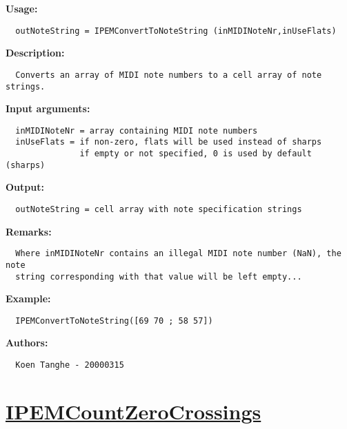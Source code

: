 \textbf{Usage:}
\begin{verbatim}  outNoteString = IPEMConvertToNoteString (inMIDINoteNr,inUseFlats)

\end{verbatim}
\textbf{Description:}
\begin{verbatim}  Converts an array of MIDI note numbers to a cell array of note strings.

\end{verbatim}
\textbf{Input arguments:}
\begin{verbatim}  inMIDINoteNr = array containing MIDI note numbers
  inUseFlats = if non-zero, flats will be used instead of sharps
               if empty or not specified, 0 is used by default (sharps)

\end{verbatim}
\textbf{Output:}
\begin{verbatim}  outNoteString = cell array with note specification strings

\end{verbatim}
\textbf{Remarks:}
\begin{verbatim}  Where inMIDINoteNr contains an illegal MIDI note number (NaN), the note
  string corresponding with that value will be left empty...

\end{verbatim}
\textbf{Example:}
\begin{verbatim}  IPEMConvertToNoteString([69 70 ; 58 57])

\end{verbatim}
\textbf{Authors:}
\begin{verbatim}  Koen Tanghe - 20000315
\end{verbatim}


\newpage
\section*{\hyperlink{Concepts:IPEMCountZeroCrossings}{IPEMCountZeroCrossings}}
\hypertarget{FuncRef:IPEMCountZeroCrossings}{}

